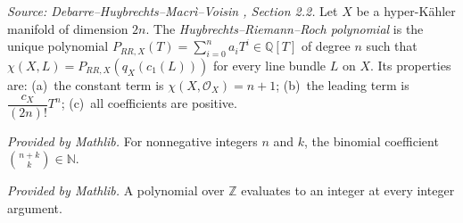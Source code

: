 \begin{definition}
  \label{def:hrr-polynomial}
  \textit{Source: Debarre--Huybrechts--Macr\`i--Voisin \cite{MR4654610}, Section 2.2.}
  Let \(X\) be a hyper-K\"ahler manifold of dimension \(2n\).  The
  \emph{Huybrechts--Riemann--Roch polynomial} is the unique polynomial
  \(P_{RR,X}(T) = \sum_{i=0}^n a_i T^i \in \mathbb{Q}[T]\) of degree \(n\) such that
  \(\chi(X, L) = P_{RR,X}(q_X(c_1(L)))\) for every line bundle \(L\) on \(X\).  Its
  properties are: (a)~the constant term is \(\chi(X, \mathcal{O}_X) = n+1\); (b)~the
  leading term is \(\dfrac{c_X}{(2n)!}T^n\); (c)~all coefficients are positive.
\end{definition}

\begin{lemma}
  \label{lem:binomial-coefficient}
  \mathlibok
  \textit{Provided by Mathlib.}
  For nonneg\-ative integers \(n\) and \(k\), the binomial coefficient \(\binom{n+k}{k} \in \mathbb{N}\).
\end{lemma}

\begin{lemma}
  \label{lem:integer-valued-polynomial}
  \mathlibok
  \textit{Provided by Mathlib.}
  A polynomial over \(\mathbb{Z}\) evaluates to an integer at every integer argument.
\end{lemma}

